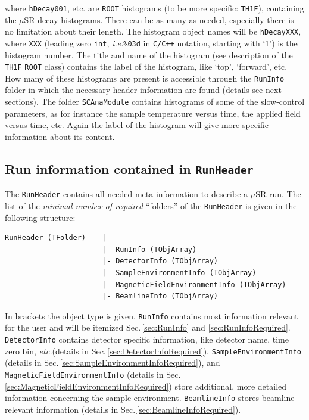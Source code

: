\documentclass[twoside]{article}
\newcommand{\musr}{$\mu$SR\xspace}
\newcommand{\rootcern}{\texttt{ROOT}\xspace}
\newcommand{\ie}{\emph{i.e.}\xspace}
\newcommand{\etc}{\emph{etc.}\xspace}
\begin{document}
\noindent where \texttt{hDecay001}, etc. are \rootcern histograms (to be more specific: \texttt{TH1F}), containing the \musr decay histograms. There can be as many as needed, especially there is no limitation about their length. The histogram object names will be \texttt{hDecayXXX}, where \texttt{XXX} (leading zero \texttt{int}, \ie \verb?%03d? in \texttt{C/C++} notation, starting with `1') is the histogram number. The title and name of the histogram (see description of the \texttt{TH1F} \rootcern class) contains the label of the histogram, like `top', `forward', etc. How many of these histograms are present is accessible through the \texttt{RunInfo} folder in which the necessary header information are found (details see next sections). The folder \texttt{SCAnaModule} contains histograms of some of the slow-control parameters, as for instance the sample temperature versus time, the applied field versus time, etc. Again the label of the histogram will give more specific information about its content.

\subsection{Run information contained in \texttt{RunHeader}}\label{sec:RunHeader}

The \texttt{RunHeader} contains all needed meta-information to describe a \musr-run. The list of the \emph{minimal number of required} ``folders'' of the \texttt{RunHeader} is given in the following structure:

\begin{small}
\begin{verbatim}
RunHeader (TFolder) ---|
                       |- RunInfo (TObjArray)
                       |- DetectorInfo (TObjArray)
                       |- SampleEnvironmentInfo (TObjArray)
                       |- MagneticFieldEnvironmentInfo (TObjArray)
                       |- BeamlineInfo (TObjArray)
\end{verbatim}
\end{small}

\noindent In brackets the object type is given. \texttt{RunInfo} contains most information relevant for the user and will be itemized Sec.\,\ref{sec:RunInfo} and \ref{sec:RunInfoRequired}. \texttt{DetectorInfo} contains detector specific information, like detector name, time zero bin, \etc (details in Sec.\,\ref{sec:DetectorInfoRequired}). \texttt{SampleEnvironmentInfo} (details in Sec.\,\ref{sec:SampleEnvironmentInfoRequired}), and \texttt{MagneticFieldEnvironmentInfo} (details in Sec.\,\ref{sec:MagneticFieldEnvironmentInfoRequired}) store additional, more detailed information concerning the sample environment. \texttt{BeamlineInfo} stores beamline relevant information (details in Sec.\,\ref{sec:BeamlineInfoRequired}).
\end{document}
